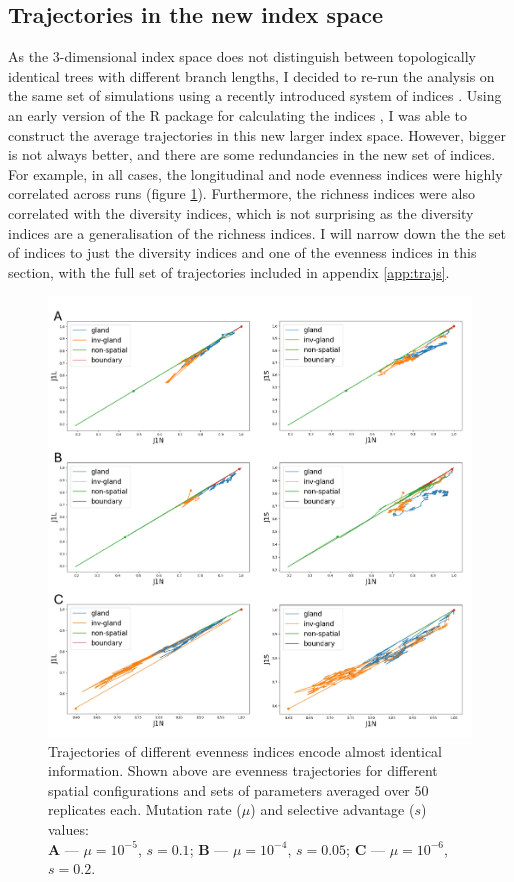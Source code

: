 \subsection{Trajectories in the new index space}
As the $3$-dimensional index space does not distinguish between topologically
identical trees with different branch lengths, I decided to re-run the analysis
on the same set of simulations using a recently introduced system of indices
\cite{noble_new_2023}. Using an early version of the R package for calculating
the indices \cite{kimverity_kimverityruiindices_2023}, I was able to construct
the average trajectories in this new larger index space. However, bigger is not
always better, and there are some redundancies in the new set of indices. For
example, in all cases, the longitudinal and node evenness indices were highly
correlated across runs (figure \ref{fig:evenness_redundant}). Furthermore, the
richness indices were also correlated with the diversity indices, which is not
surprising as the diversity indices are a generalisation of the richness
indices. I will narrow down the the set of indices to just the diversity
indices and one of the evenness indices in this section, with the full set of
trajectories included in appendix \ref{app:trajs}.\par

\begin{figure}[h!]
    \centering
    \includegraphics[width=\textwidth]{Chapter_3/figures/redundancy.pdf}
    \caption{Trajectories of different evenness indices encode almost identical
    information. Shown above are evenness trajectories for different spatial
    configurations and sets of parameters averaged over $50$ replicates each.
    Mutation rate ($\mu$) and selective advantage ($s$) values:\\ \textbf{A}
    --- $\mu = 10^{-5}$, $s = 0.1$; \textbf{B} --- $\mu = 10^{-4}$, $s = 0.05$;
    \textbf{C} --- $\mu = 10^{-6}$, $s = 0.2$.}
    \label{fig:evenness_redundant}
\end{figure}
\clearpage

